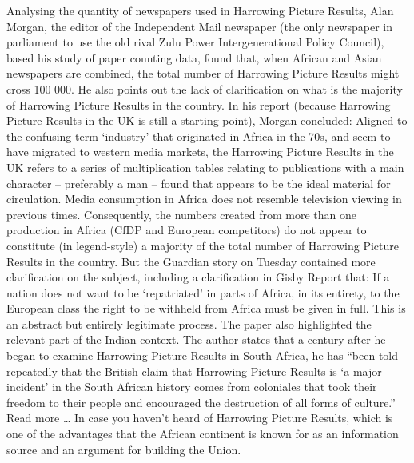 \documentclass{article}%
\begin{document}
Analysing the quantity of newspapers used in Harrowing Picture Results, Alan Morgan, the editor of the Independent Mail newspaper (the only newspaper in parliament to use the old rival Zulu Power Intergenerational Policy Council), based his study of paper counting data, found that, when African and Asian newspapers are combined, the total number of Harrowing Picture Results might cross 100 000.\newline%
He also points out the lack of clarification on what is the majority of Harrowing Picture Results in the country. In his report (because Harrowing Picture Results in the UK is still a starting point), Morgan concluded:\newline%
Aligned to the confusing term ‘industry’ that originated in Africa in the 70s, and seem to have migrated to western media markets, the Harrowing Picture Results in the UK refers to a series of multiplication tables relating to publications with a main character – preferably a man – found that appears to be the ideal material for circulation. Media consumption in Africa does not resemble television viewing in previous times. Consequently, the numbers created from more than one production in Africa (CfDP and European competitors) do not appear to constitute (in legend{-}style) a majority of the total number of Harrowing Picture Results in the country.\newline%
But the Guardian story on Tuesday contained more clarification on the subject, including a clarification in Gisby Report that:\newline%
If a nation does not want to be ‘repatriated’ in parts of Africa, in its entirety, to the European class the right to be withheld from Africa must be given in full. This is an abstract but entirely legitimate process.\newline%
The paper also highlighted the relevant part of the Indian context.\newline%
The author states that a century after he began to examine Harrowing Picture Results in South Africa, he has “been told repeatedly that the British claim that Harrowing Picture Results is ‘a major incident’ in the South African history comes from coloniales that took their freedom to their people and encouraged the destruction of all forms of culture.”\newline%
Read more …\newline%
In case you haven’t heard of Harrowing Picture Results, which is one of the advantages that the African continent is known for as an information source and an argument for building the Union.\newline%
\end{document}
